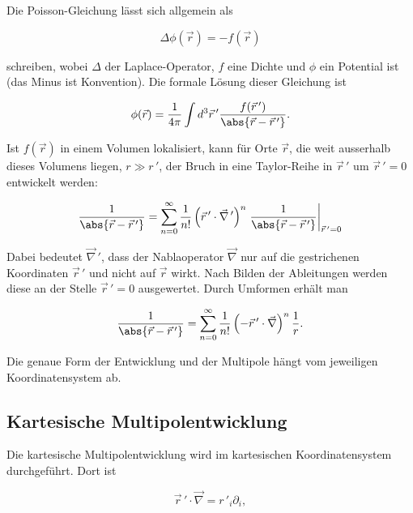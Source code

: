 Die Poisson-Gleichung lässt sich allgemein als

\begin{equation*}
\Delta \phi (\vec{r}) = - f (\vec{r})
\end{equation*}

\noindent
schreiben, wobei \(\Delta\) der Laplace-Operator, \(f\) eine Dichte und \(\phi\) ein Potential ist (das Minus ist Konvention).
Die formale Lösung dieser Gleichung ist

\begin{equation*}
\phi (\vec{r}) = \frac{1}{4\pi} \int d^3 \vec{r}\,' \frac{f (\vec{r}\,')} {\abs{\vec{r} - \vec{r}\,'}}.
\end{equation*}

\noindent
Ist \(f (\vec{r})\) in einem Volumen lokalisiert, kann für Orte \(\vec{r}\), die weit ausserhalb dieses Volumens liegen, \(r \gg r\,'\), der Bruch in eine Taylor-Reihe in \(\vec{r}\,'\) um \(\vec{r}\,' = 0\) entwickelt werden:

\begin{equation*}
\frac{1}{\abs{\vec{r} - \vec{r}\,'}} = \sum_{n=0}^{\infty} \frac{1}{n!} \left( \vec{r}\,' \cdot \vec{\nabla}\,' \right)^n \left. \frac{1}{\abs{\vec{r} - \vec{r}\,'}} \right|_{\vec{r}\,'=0}
\end{equation*}

\noindent
Dabei bedeutet \(\vec{\nabla}\,'\), dass der Nablaoperator \(\vec{\nabla}\) nur auf die gestrichenen Koordinaten \(\vec{r}\,'\) und nicht auf \(\vec{r}\) wirkt.
Nach Bilden der Ableitungen werden diese an der Stelle \(\vec{r}\,' = 0\) ausgewertet.
Durch Umformen erhält man

\begin{equation*}
\frac{1}{\abs{ \vec{r} - \vec{r}\,'}} = \sum_{n=0}^{\infty} \frac{1}{n!} \left( - \vec{r}\,' \cdot \vec{\nabla} \right)^n \frac{1}{r}.
\end{equation*}

\noindent
Die genaue Form der Entwicklung und der Multipole hängt vom jeweiligen Koordinatensystem ab.

\subsection{Kartesische Multipolentwicklung
\label{planet:subsection:kartentwicklung}}

Die kartesische Multipolentwicklung wird im kartesischen Koordinatensystem durchgeführt.
Dort ist

\begin{equation*}
\vec{r}\,' \cdot \vec{\nabla} = r\,'_{i} \partial_{i},
\end{equation*}


